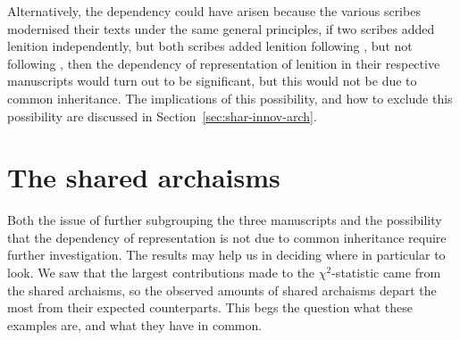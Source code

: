 Alternatively, the dependency could have arisen because the various scribes modernised their texts under the same general principles, \eg if two scribes added lenition independently, but both scribes added lenition following , but not following , then the dependency of representation of lenition in their respective manuscripts would turn out to be significant, but this would not be due to common inheritance. The implications of this possibility, and how to exclude this possibility are discussed in Section~\ref{sec:shar-innov-arch}. 


\section{The shared archaisms}
\label{sec:beyond-stat-again}

Both the issue of further subgrouping the three manuscripts and the  possibility that the dependency of representation is not due to common inheritance require further investigation. The results may help us in deciding where in particular to look. We saw that the largest contributions made to the \(\chi^2\)-statistic came from the shared archaisms, so the observed amounts of shared archaisms depart the most from their expected counterparts. This begs the question what these examples are, and what they have in common. 



